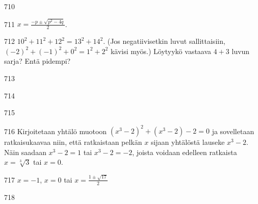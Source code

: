 \begin{Vastaus}{710}
    
\end{Vastaus}
\begin{Vastaus}{711}
		$x=\frac{-p \pm \sqrt{p^2-4q}}{2}$.
	
\end{Vastaus}
\begin{Vastaus}{712}
		$10^2+11^2+12^2 = 13^2 + 14^2$.
    	(Jos negatiivisetkin luvut sallittaisiin, $(-2)^2+(-1)^2+0^2 = 1^2 + 2^2$ kävisi myös.) Löytyykö vastaava $4 + 3$ luvun sarja? Entä pidempi?
    
\end{Vastaus}
\begin{Vastaus}{713}
    
\end{Vastaus}
\begin{Vastaus}{714}
    
\end{Vastaus}
\begin{Vastaus}{715}
    
\end{Vastaus}
\begin{Vastaus}{716}
		Kirjoitetaan yhtälö muotoon $(x^3-2)^2+(x^3-2)-2=0$ ja sovelletaan ratkaisukaavaa niin, että ratkaistaan pelkän $x$ sijaan yhtälöstä lauseke $x^3-2$. Näin saadaan $x^3-2=1$ tai $x^3-2=-2$, joista voidaan edelleen ratkaista $x=\sqrt[3]{3}$ tai $x=0$.
	
\end{Vastaus}
\begin{Vastaus}{717}
		$x=-1$, $x=0$ tai $x=\frac{1 \pm \sqrt{17}}{2}$
	
\end{Vastaus}
\begin{Vastaus}{718}
	
\end{Vastaus}
